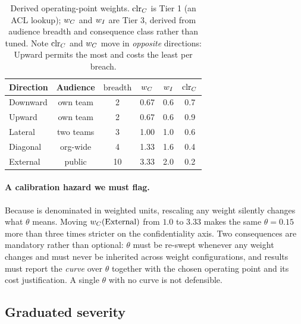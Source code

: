 \begin{table}[t]
\centering
\caption{Derived operating-point weights. $\mathrm{clr}_C$ is Tier 1 (an ACL lookup);
$w_C$ and $w_I$ are Tier 3, derived from audience breadth and consequence class
rather than tuned. Note $\mathrm{clr}_C$ and $w_C$ move in \emph{opposite} directions:
Upward permits the most and costs the least per breach.}
\label{tab:weights}
\footnotesize
\begin{tabular}{@{}lccccc@{}}
\toprule
\textbf{Direction} & \textbf{Audience} & $\mathrm{breadth}$ & $w_C$ & $w_I$ & $\mathrm{clr}_C$ \\
\midrule
Downward & own team      & 2  & 0.67 & 0.6 & 0.7 \\
Upward   & own team      & 2  & 0.67 & 0.6 & 0.9 \\
Lateral  & two teams     & 3  & 1.00 & 1.0 & 0.6 \\
Diagonal & org-wide      & 4  & 1.33 & 1.6 & 0.4 \\
External & public        & 10 & 3.33 & 2.0 & 0.2 \\
\bottomrule
\end{tabular}
\end{table}

\paragraph{A calibration hazard we must flag.} Because  is
denominated in weighted units, rescaling any weight silently changes what
$\theta$ means. Moving $w_C(\text{External})$ from $1.0$ to $3.33$ makes the
same $\theta=0.15$ more than three times stricter on the confidentiality axis.
Two consequences are mandatory rather than optional: $\theta$ must be re-swept
whenever any weight changes and must never be inherited across weight
configurations, and results must report the \emph{curve} over $\theta$ together
with the chosen operating point and its cost justification. A single $\theta$
with no curve is not defensible. 

\subsection{Graduated severity}
\label{sec:method:severity}

